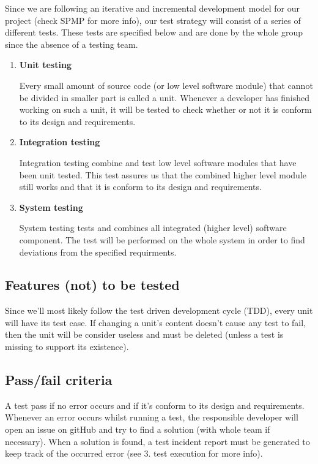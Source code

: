 \documentclass[12pt]{article}
\begin{document}
Since we are following an iterative and incremental development model
for our project (check SPMP for more info), our test strategy will
consist of a series of different tests. These tests are specified below
and are done by the whole group since the absence of a testing team.

\begin{enumerate}
\def\labelenumi{\arabic{enumi}.}
\item
  \textbf{Unit testing}

  Every small amount of source code (or low level software module) that
  cannot be divided in smaller part is called a unit. Whenever a
  developer has finished working on such a unit, it will be tested to
  check whether or not it is conform to its design and requirements.
\item
  \textbf{Integration testing}

  Integration testing combine and test low level software modules that
  have been unit tested. This test assures us that the combined higher
  level module still works and that it is conform to its design and
  requirements.
\item
  \textbf{System testing}

  System testing tests and combines all integrated (higher level)
  software component. The test will be performed on the whole system in
  order to find deviations from the specified requirments.
\end{enumerate}

\subsection{Features (not) to be
tested}\label{features-not-to-be-tested}

Since we'll most likely follow the test driven development cycle (TDD),
every unit will have its test case. If changing a unit's content doesn't
cause any test to fail, then the unit will be consider useless and must
be deleted (unless a test is missing to support its existence).

\subsection{Pass/fail criteria}\label{passfail-criteria}

A test pass if no error occurs and if it's conform to its design and
requirements. Whenever an error occurs whilst running a test, the
responsible developer will open an issue on gitHub and try to find a
solution (with whole team if necessary). When a solution is found, a
test incident report must be generated to keep track of the occurred
error (see 3. test execution for more info).
\end{document}
